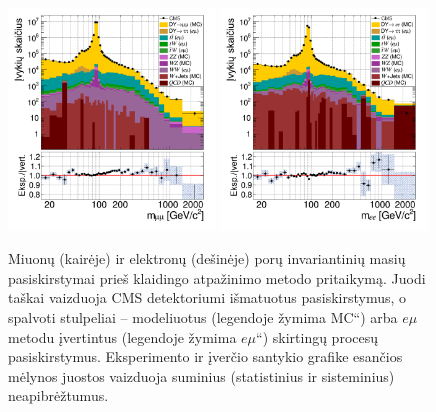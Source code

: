 \documentclass[a4paper, 12pt, oneside]{article}
\newcommand{\emu}{e\mu}
\newcommand{\ltq}[1]{{\quotedblbase{}#1\textquotedblleft{}}}
\newlength\q
\begin{document}
\begin{figure}[b!]
	\includegraphics[width=0.49\textwidth]{Magistrinis/MuMumass_beforeFR.png}
	\includegraphics[width=0.49\textwidth]{Magistrinis/EEmass_beforeFR.png}
	\vspace{-0.5cm}
	\caption{\label{fig:MassBefore}
		Miuonų (kairėje) ir elektronų (dešinėje) porų invariantinių masių pasiskirstymai prieš klaidingo atpažinimo metodo
		pritaikymą.
		Juodi taškai vaizduoja CMS detektoriumi išmatuotus pasiskirstymus, o spalvoti stulpeliai -- modeliuotus (legendoje
		žymima \ltq{MC}) arba $\emu$ metodu įvertintus (legendoje žymima \ltq{$\emu$}) skirtingų procesų pasiskirstymus.
		Eksperimento ir įverčio santykio grafike esančios mėlynos juostos vaizduoja suminius (statistinius ir sisteminius)
		neapibrėžtumus.}
\end{figure}
\end{document}
